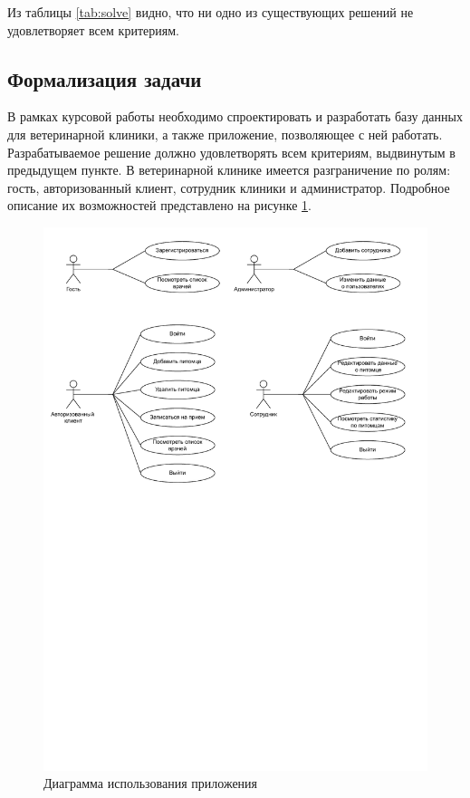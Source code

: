 Из таблицы \ref{tab:solve} видно, что ни одно из существующих решений не удовлетворяет всем критериям.

\subsection{Формализация задачи}

В рамках курсовой работы необходимо спроектировать и разработать базу данных для ветеринарной клиники, а также приложение, позволяющее с ней работать. Разрабатываемое решение должно удовлетворять всем критериям, выдвинутым в предыдущем пункте. В ветеринарной клинике имеется разграничение по ролям: гость, авторизованный клиент, сотрудник клиники и администратор. Подробное описание их возможностей представлено на рисунке \ref{img:use-case}.

\begin{figure}[!h]
	\centering
	\includegraphics[width=\textwidth]{image/use-case.pdf}
	\caption{Диаграмма использования приложения}
	\label{img:use-case}
\end{figure}

